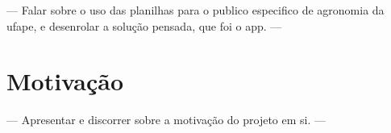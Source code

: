  — Falar sobre o uso das planilhas para o publico especifico de agronomia da ufape, e desenrolar a solução pensada, que foi o app. — 



\section[Motivação]{Motivação}

 — Apresentar e discorrer sobre a motivação do projeto em si. — 


